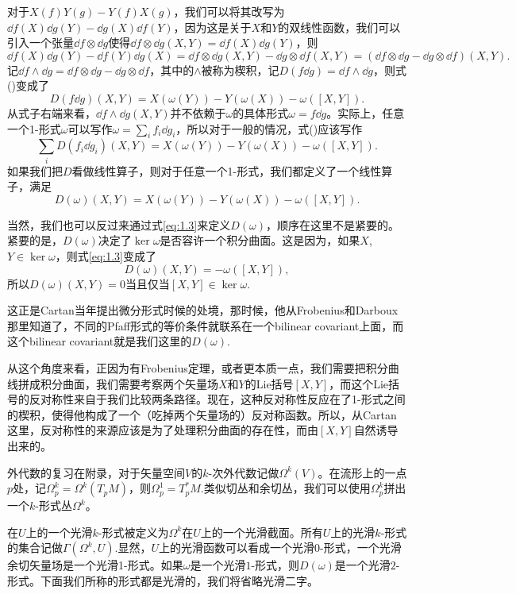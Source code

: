 对于$X(f)Y(g)-Y(f)X(g)$，我们可以将其改写为$\dd f(X)\dd g(Y)-\dd g(X)\dd f(Y)$，因为这是关于$X$和$Y$的双线性函数，我们可以引入一个张量$\dd f\otimes \dd g$使得$\dd f\otimes \dd g(X,Y)=\dd f(X)\dd g(Y)$，则
\[
	\dd f(X)\dd g(Y)-\dd f(Y)\dd g(X)=\dd f\otimes \dd g(X,Y)-\dd g\otimes \dd f(X,Y)=(\dd f\otimes \dd g-\dd g\otimes \dd f)(X,Y).
\]
记$\dd f\wedge \dd g=\dd f\otimes \dd g-\dd g\otimes \dd f$，其中的$\wedge$被称为楔积，记$D(f\dd g)=\dd f\wedge \dd g$，则式(\theequation)变成了
\[
	D(f\dd g)(X,Y)=X(\omega(Y))-Y(\omega(X))-\omega([X,Y]).
\]
从式子右端来看，$\dd f\wedge \dd g(X,Y)$并不依赖于$\omega$的具体形式$\omega=f\dd g$。实际上，任意一个1-形式$\omega$可以写作$\omega=\sum_i f_i\dd g_i$，所以对于一般的情况，式(\theequation)应该写作
\[
	\sum_iD(f_i\dd g_i)(X,Y)=X(\omega(Y))-Y(\omega(X))-\omega([X,Y]).
\]
如果我们把$D$看做线性算子，则对于任意一个1-形式，我们都定义了一个线性算子，满足
\begin{equation}
	D(\omega)(X,Y)=X(\omega(Y))-Y(\omega(X))-\omega([X,Y]).
	\label{eq:1.3}
\end{equation}

\para 当然，我们也可以反过来通过式\eqref{eq:1.3}来定义$D(\omega)$，顺序在这里不是紧要的。紧要的是，$D(\omega)$决定了$\ker \omega$是否容许一个积分曲面。这是因为，如果$X$, $Y\in \ker \omega$，则式\eqref{eq:1.3}变成了
\[
	D(\omega)(X,Y)=-\omega([X,Y]),
\]
所以$D(\omega)(X,Y)=0$当且仅当$[X,Y]\in \ker \omega$.

这正是Cartan当年提出微分形式时候的处境，那时候，他从Frobenius和Darboux那里知道了，不同的Pfaff形式的等价条件就联系在一个bilinear covariant上面，而这个bilinear covariant就是我们这里的$D(\omega)$.

从这个角度来看，正因为有Frobenius定理，或者更本质一点，我们需要把积分曲线拼成积分曲面，我们需要考察两个矢量场$X$和$Y$的Lie括号$[X,Y]$，而这个Lie括号的反对称性来自于我们比较两条路径。现在，这种反对称性反应在了1-形式之间的楔积，使得他构成了一个（吃掉两个矢量场的）反对称函数。所以，从Cartan这里，反对称性的来源应该是为了处理积分曲面的存在性，而由$[X,Y]$自然诱导出来的。

\para 外代数的复习在附录，对于矢量空间$V$的$k$-次外代数记做$\Omega^k(V)$。在流形上的一点$p$处，记$\Omega_p^k=\Omega^k(T_pM)$，则$\Omega_p^1=T_p^*M$.类似切丛和余切丛，我们可以使用$\Omega_p^k$拼出一个$k$-形式丛$\Omega^k$。

\para 在$U$上的一个光滑$k$-形式被定义为$\Omega^k$在$U$上的一个光滑截面。所有$U$上的光滑$k$-形式的集合记做$\Gamma(\Omega^k,U)$.显然，$U$上的光滑函数可以看成一个光滑$0$-形式，一个光滑余切矢量场是一个光滑1-形式。如果$\omega$是一个光滑$1$-形式，则$D(\omega)$是一个光滑$2$-形式。下面我们所称的形式都是光滑的，我们将省略光滑二字。

